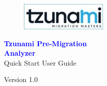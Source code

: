 \pagestyle{empty}
\begin{figure}[tp] %
\includegraphics{images/TzunamiLogo}
\end{figure}
\begin{flushright}  
	\vspace*{\fill}
	 \textcolor{blue}{\huge \textbf{Tzunami Pre-Migration}}\\
	\textcolor{blue}{\huge \textbf{{Analyzer}\\}}  
	Quick Start User Guide
	\vspace*{\fill}
\par

\end{flushright}
\begin{center} 
{\Large\vspace*{2mm} \par\vspace*{4mm} \vspace*{3mm}\large Version 1.0}\par %
\end{center} 
 
